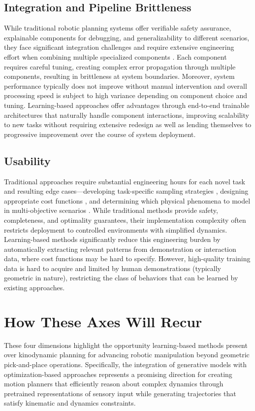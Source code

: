 \subsection{Integration and Pipeline Brittleness}
\label{sec:framework:integration}

While traditional robotic planning systems offer verifiable safety assurance, explainable components for debugging, and generalizability to different scenarios, they face significant integration challenges and require extensive engineering effort when combining multiple specialized components \cite{abderezaei2024clutter}. Each component requires careful tuning, creating complex error propagation through multiple components, resulting in brittleness at system boundaries. Moreover, system performance typically does not improve without manual intervention and overall processing speed is subject to high variance depending on component choice and tuning.
Learning-based approaches offer advantages through end-to-end trainable architectures that naturally handle component interactions, improving scalability to new tasks without requiring extensive redesign as well as lending themselves to progressive improvement over the course of system deployment.

\subsection{Usability}
\label{sec:framework:usability}

Traditional approaches require substantial engineering hours for each novel task and resulting edge cases---developing task-specific sampling strategies \cite{abderezaei2024clutter}, designing appropriate cost functions \cite{pasricha2024virtues}, and determining which physical phenomena to model in multi-objective scenarios \cite{pasricha2022pokerrt}. While traditional methods provide safety, completeness, and optimality guarantees, their implementation complexity often restricts deployment to controlled environments with simplified dynamics.
Learning-based methods significantly reduce this engineering burden by automatically extracting relevant patterns from demonstration or interaction data, where cost functions may be hard to specify.
However, high-quality training data is hard to acquire and limited by human demonstrations (typically geometric in nature), restricting the class of behaviors that can be learned by existing approaches.

\section{How These Axes Will Recur}
\label{sec:framework:recurrence}

These four dimensions highlight the opportunity learning-based methods present over kinodynamic planning for advancing robotic manipulation beyond geometric pick-and-place operations. Specifically, the integration of generative models with optimization-based approaches represents a promising direction for creating motion planners that efficiently reason about complex dynamics through pretrained representations of sensory input while generating trajectories that satisfy kinematic and dynamics constraints.
